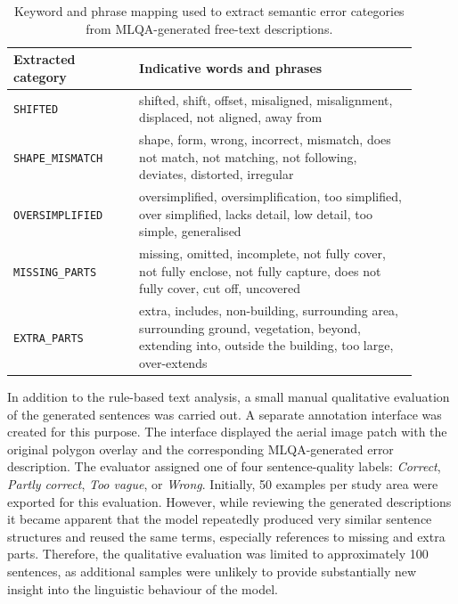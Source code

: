 \begin{table}[htb]
\centering
\caption{Keyword and phrase mapping used to extract semantic error categories from MLQA-generated free-text descriptions.}
\label{tab:semantic_sentence_keyword_mapping}
\begin{tabular}{p{0.28\linewidth}p{0.62\linewidth}}
\hline
\textbf{Extracted category} & \textbf{Indicative words and phrases} \\
\hline

\texttt{SHIFTED} &
shifted, shift, offset, misaligned, misalignment, displaced, not aligned, away from \\

\texttt{SHAPE\_MISMATCH} &
shape, form, wrong, incorrect, mismatch, does not match, not matching, not following, deviates, distorted, irregular \\

\texttt{OVERSIMPLIFIED} &
oversimplified, oversimplification, too simplified, over simplified, lacks detail, low detail, too simple, generalised \\

\texttt{MISSING\_PARTS} &
missing, omitted, incomplete, not fully cover, not fully enclose, not fully capture, does not fully cover, cut off, uncovered \\

\texttt{EXTRA\_PARTS} &
extra, includes, non-building, surrounding area, surrounding ground, vegetation, beyond, extending into, outside the building, too large, over-extends \\

\hline
\end{tabular}
\end{table}

In addition to the rule-based text analysis, a small manual qualitative evaluation of the generated sentences was carried out. A separate annotation interface was created for this purpose. The interface displayed the aerial image patch with the original polygon overlay and the corresponding MLQA-generated error description. The evaluator assigned one of four sentence-quality labels: \textit{Correct}, \textit{Partly correct}, \textit{Too vague}, or \textit{Wrong}. Initially, 50 examples per study area were exported for this evaluation. However, while reviewing the generated descriptions it became apparent that the model repeatedly produced very similar sentence structures and reused the same terms, especially references to missing and extra parts. Therefore, the qualitative evaluation was limited to approximately 100 sentences, as additional samples were unlikely to provide substantially new insight into the linguistic behaviour of the model.

